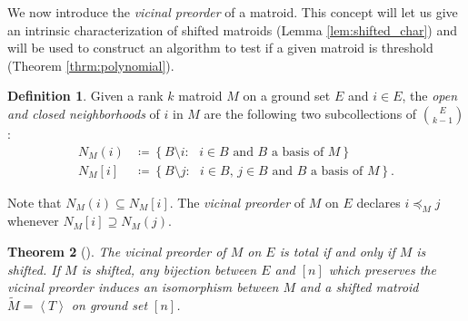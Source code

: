 \documentclass{amsart}
\theoremstyle{definition}
\newtheorem{defn}{Definition}[section]
\theoremstyle{plain}
\newtheorem{thrm}[defn]{Theorem}
\begin{document}
We now introduce the \emph{vicinal preorder} of a matroid. This concept will let us give an intrinsic characterization of shifted matroids (Lemma \ref{lem:shifted_char}) and will be used to construct an algorithm to test if a given matroid is threshold (Theorem \ref{thrm:polynomial}).


\begin{defn}
Given a rank $k$ matroid $M$ on a ground set $E$ and $i\in E$, the \emph{open and closed neighborhoods} of $i$ in $M$ are the following two subcollections of $\binom{E}{k-1}$:
\begin{align*}
N_M(i) &\coloneqq \left\{ B\setminus i : \text{ $i\in B$ and $B$ a basis of $M$}\right\}\\
N_M[i] &\coloneqq \left\{ B\setminus j : \text{ $i\in B$, $j\in B$ and $B$ a basis of $M$}\right\}.
\end{align*}

Note that $N_{M}(i)\subseteq N_{M}[i]$. The \emph{vicinal preorder} of $M$ on $E$ declares $i\preceq_M j$ whenever $N_M[i] \supseteq N_M(j)$.
\end{defn}

\begin{thrm}[{\cite[Theorem $1$]{Klivans}}]
  \label{thrm:vicinal}
The vicinal preorder of $M$ on $E$ is total if and only if $M$ is shifted. If $M$ is shifted, any bijection between $E$ and $[n]$ which preserves the vicinal preorder induces an isomorphism between $M$ and a shifted matroid $\tilde M= \left\langle T \right\rangle$ on ground set $[n]$.
\end{thrm}
\end{document}
